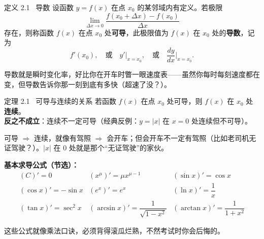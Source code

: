 \documentclass[12pt,a4paper]{article}
\newcommand{\redtext}[1]{{\color{MainRed}\textbf{#1}}}
\newcommand{\humor}[1]{\par\smallskip\begin{humorbox}#1\end{humorbox}\smallskip}
\begin{document}
\begin{defbox}{定义 2.1 \ 导数}
设函数 $y = f(x)$ 在点 $x_0$ 的某邻域内有定义。若极限
\[
\lim_{\Delta x \to 0} \frac{f(x_0 + \Delta x) - f(x_0)}{\Delta x}
\]
存在，则称函数 $f(x)$ 在点 $x_0$ 处\textbf{可导}，此极限值为 $f(x)$ 在 $x_0$ 处的\textbf{导数}，记为
\[
f'(x_0), \quad \text{或} \quad y'\big|_{x=x_0}, \quad \text{或} \quad \frac{dy}{dx}\bigg|_{x=x_0}.
\]
\end{defbox}
\humor{导数就是瞬时变化率，好比你在开车时瞥一眼速度表——虽然你每时每刻速度都在变，但导数告诉你那一刻到底有多快（超速了没？）。}

\begin{center}
\end{center}

\begin{thmbox}{定理 2.1 \ 可导与连续的关系}
若函数 $f(x)$ 在点 $x_0$ 处可导，则 $f(x)$ 在 $x_0$ 处\redtext{连续}。\\
\textbf{反之不成立}：连续不一定可导（经典反例：$y=|x|$ 在 $x=0$ 处连续但不可导）。
\end{thmbox}
\humor{可导 $\Rightarrow$ 连续，就像有驾照 $\Rightarrow$ 会开车；但会开车不一定有驾照（比如老司机无证驾驶？）。$|x|$ 在 $0$ 处就是那个“无证驾驶”的家伙。}

\begin{formulaframe}
\centering
\textbf{基本求导公式（节选）：}
\[
\begin{array}{lll}
(C)' = 0 & (x^\mu)' = \mu x^{\mu-1} & (\sin x)' = \cos x \\[6pt]
(\cos x)' = -\sin x & (e^x)' = e^x & (\ln x)' = \dfrac{1}{x} \\[6pt]
(\tan x)' = \sec^2 x & (\arcsin x)' = \dfrac{1}{\sqrt{1-x^2}} & (\arctan x)' = \dfrac{1}{1+x^2}
\end{array}
\]
\end{formulaframe}
\humor{这些公式就像乘法口诀，必须背得滚瓜烂熟，不然考试时你会后悔的。}
\end{document}
